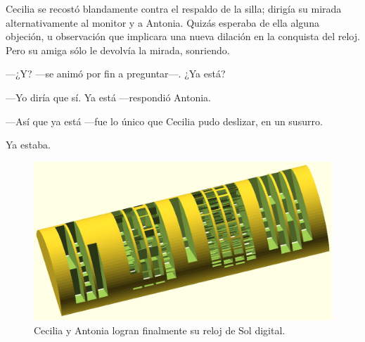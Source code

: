 Cecilia se recostó blandamente contra el respaldo de la silla; dirigía
su mirada alternativamente al monitor y a Antonia. Quizás esperaba de
ella alguna objeción, u observación que implicara una nueva dilación
en la conquista del reloj. Pero su amiga sólo le devolvía la mirada,
sonriendo.

---¿Y? ---se animó por fin a preguntar---. ¿Ya está?

---Yo diría que sí. Ya está ---respondió Antonia.

---Así que ya está ---fue lo único que Cecilia pudo deslizar, en un
susurro.

Ya estaba.



\begin{figure}[ht]
  \centering
  \includegraphics[width=1\textwidth]{imagenes/horas-decenas-2}  
  \caption{Cecilia y Antonia logran finalmente su reloj de Sol
    digital.}
  \label{fig:horas-decenas-2}
\end{figure}



